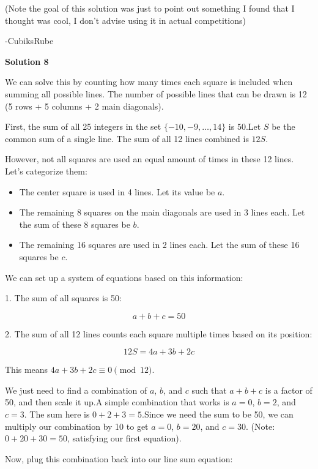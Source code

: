 \begin{enumerate}
 (Note the goal of this solution was just to point out something I found that I thought was cool, I don't advise using it in actual competitions)

 -CubiksRube

 



\textbf{Solution 8}

We can solve this by counting how many times each square is included when summing all possible lines. The number of possible lines that can be drawn is 12 (5 rows + 5 columns + 2 main diagonals).

 First, the sum of all 25 integers in the set $\{-10, -9, \dots, 14\}$ is $50$.Let $S$ be the common sum of a single line. The sum of all 12 lines combined is $12S$.

 However, not all squares are used an equal amount of times in these 12 lines. Let's categorize them:

 
            \begin{itemize}
        \item The center square is used in 4 lines. Let its value be $a$.
        \item The remaining 8 squares on the main diagonals are used in 3 lines each. Let the sum of these 8 squares be $b$.
        \item The remaining 16 squares are used in 2 lines each. Let the sum of these 16 squares be $c$.
            \end{itemize}
            We can set up a system of equations based on this information:

 1. The sum of all squares is 50:

 
 \[a + b + c = 50\]

 
2. The sum of all 12 lines counts each square multiple times based on its position:

 
 \[12S = 4a + 3b + 2c\]

 


 This means $4a + 3b + 2c \equiv 0 \pmod{12}$.

 We just need to find a combination of $a$, $b$, and $c$ such that $a + b + c$ is a factor of 50, and then scale it up.A simple combination that works is $a=0$, $b=2$, and $c=3$. The sum here is $0 + 2 + 3 = 5$.Since we need the sum to be 50, we can multiply our combination by 10 to get $a=0$, $b=20$, and $c=30$. (Note: $0 + 20 + 30 = 50$, satisfying our first equation).

 Now, plug this combination back into our line sum equation:


\end{enumerate}
